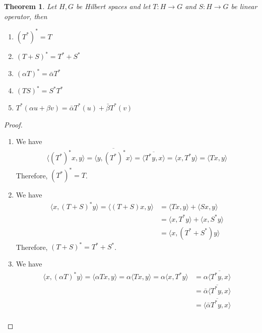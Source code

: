 \documentclass{report}
\newtheorem{thm}{Theorem}
\begin{document}
\begin{thm}
  Let $H,G$ be Hilbert spaces and let $T:H\to G$ and $S:H\to G$ be linear operator, then
  \begin{enumerate}
    \item $\left(T^{*}\right)^{*}=T$
    \item $(T+S)^{*} = T^{*} + S^{*}$
    \item $(\alpha T)^{*} = \bar{\alpha}T^{*}$
    \item $(TS)^{*} = S^{*}T^{*}$
    \item $T^{*}(\alpha u+\beta v) = \bar{\alpha}T^{*}(u)+\bar{\beta}T^{*}(v)$
  \end{enumerate}
\end{thm}
\begin{proof}
  \begin{enumerate}
    \item We have
      $$
      \begin{aligned}
        \langle\left(T^{*}\right)^{*}x,y\rangle = \overline{\langle y,\left(T^{*}\right)^{*}x\rangle} = \overline{\langle T^{*}y,x\rangle} = \langle x,T^{*}y\rangle = \langle Tx,y\rangle
      \end{aligned}
      $$
      Therefore, $\left(T^{*}\right)^{*}=T$.
    \item We have
      $$
      \begin{aligned}
        \langle x,(T+S)^{*}y\rangle = \langle (T+S)x,y\rangle &= \langle Tx,y\rangle+\langle Sx,y\rangle\\
                                                              &= \langle x,T^{*}y\rangle+\langle x,S^{*}y\rangle \\
                                                              &= \langle x,(T^{*}+S^{*})y\rangle
      \end{aligned}
      $$
      Therefore, $(T+S)^{*} = T^{*}+S^{*}$.
    \item We have
      $$
      \begin{aligned}
        \langle x,(\alpha T)^{*}y\rangle = \langle\alpha Tx,y\rangle = \alpha\langle Tx,y\rangle = \alpha\langle x,T^{*}y\rangle &= \alpha\overline{\langle T^{*}y,x\rangle} \\
                                                                                                                                 &= \overline{\bar{\alpha}\langle T^{*}y,x\rangle} \\
                                                                                                                                 &= \overline{\langle \bar{\alpha}T^{*}y,x\rangle} \\

\end{aligned}$$
\end{enumerate}
\end{proof}
\end{document}
